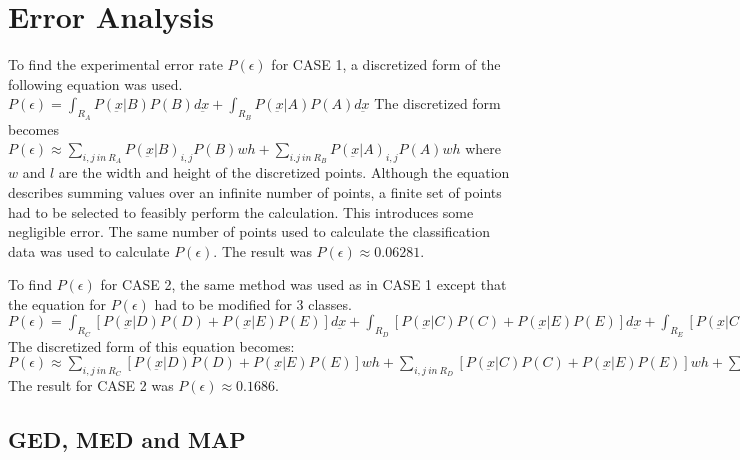 \section{Error Analysis}
To find the experimental error rate $P(\epsilon)$ for CASE 1, a discretized form of the following equation was used.
$P(\epsilon)=\int_{R_A}P(\underbar x|B)P(B)d\underbar x +
             \int_{R_B}P(\underbar x|A)P(A)d\underbar x$
The discretized form becomes
$P(\epsilon)\approx\sum_{i,j\ in\ R_A}P(\underbar x|B)_{i,j}P(B)wh +
                   \sum_{i.j\ in\ R_B}P(\underbar x|A)_{i,j}P(A)wh$
where $w$ and $l$ are the width and height of the discretized points. Although the equation describes summing values over an infinite number of points, a finite set of points had to be selected to feasibly perform the calculation. This introduces some negligible error. The same number of points used to calculate the classification data was used to calculate $P(\epsilon)$. The result was $P(\epsilon)\approx0.06281$.

To find $P(\epsilon)$ for CASE 2, the same method was used as in CASE 1 except that the equation for $P(\epsilon)$ had to be modified for 3 classes.
$P(\epsilon)=\int_{R_C}[P(\underbar x|D)P(D)+P(\underbar x|E)P(E)]d\underbar x +
             \int_{R_D}[P(\underbar x|C)P(C)+P(\underbar x|E)P(E)]d\underbar x +
             \int_{R_E}[P(\underbar x|C)P(C)+P(\underbar x|D)P(D)]d\underbar x$
The discretized form of this equation becomes:
$P(\epsilon)\approx\sum_{i,j\ in\ R_C}[P(\underbar x|D)P(D)+P(\underbar x|E)P(E)]wh +
                   \sum_{i,j\ in\ R_D}[P(\underbar x|C)P(C)+P(\underbar x|E)P(E)]wh +
                   \sum_{i,j\ in\ R_E}[P(\underbar x|C)P(C)+P(\underbar x|D)P(D)]wh$
The result for CASE 2 was $P(\epsilon)\approx0.1686$.
 
\subsection{GED, MED and MAP}

